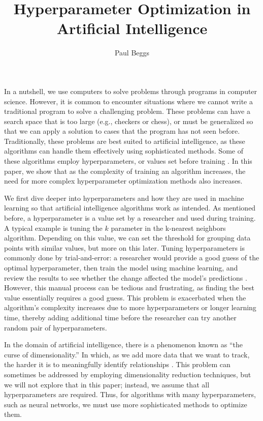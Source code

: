 \documentclass[stu,12pt,floatsintext]{apa7}
\title{Hyperparameter Optimization in Artificial Intelligence}
\author{Paul Beggs}
\affiliation{Hendrix College}
\begin{document}
\maketitle

\renewcommand{\labelenumi}{\theenumi.}

In a nutshell, we use computers to solve problems through programs in computer science. However, it is common to encounter situations where we cannot write a traditional program to solve a challenging problem. These problems can have a search space that is too large (e.g., checkers or chess), or must be generalized so that we can apply a solution to cases that the program has not seen before. Traditionally, these problems are best suited to artificial intelligence, as these algorithms can handle them effectively using sophisticated methods. Some of these algorithms employ hyperparameters, or values set before training \parencite{weerts2020importance}. In this paper, we show that as the complexity of training an algorithm increases, the need for more complex hyperparameter optimization methods also increases.

We first dive deeper into hyperparameters and how they are used in machine learning so that artificial intelligence algorithms work as intended. As mentioned before, a hyperparameter is a value set by a researcher and used during training. A typical example is tuning the \(k\) parameter in the k-nearest neighbors algorithm. Depending on this value, we can set the threshold for grouping data points with similar values, but more on this later. Tuning hyperparameters is commonly done by trial-and-error: a researcher would provide a good guess of the optimal hyperparameter, then train the model using machine learning, and review the results to see whether the change affected the model's predictions \parencite{bergstra2012random}. However, this manual process can be tedious and frustrating, as finding the best value essentially requires a good guess. This problem is exacerbated when the algorithm's complexity increases due to more hyperparameters or longer learning time, thereby adding additional time before the researcher can try another random pair of hyperparameters.

In the domain of artificial intelligence, there is a phenomenon known as ``the curse of dimensionality.'' In which, as we add more data that we want to track, the harder it is to meaningfully identify relationships \parencite{geeksforgeeks_2024_curse}. This problem can sometimes be addressed by employing dimensionality reduction techniques, but we will not explore that in this paper; instead, we assume that all hyperparameters are required. Thus, for algorithms with many hyperparameters, such as neural networks, we must use more sophisticated methods to optimize them. 
\end{document}
